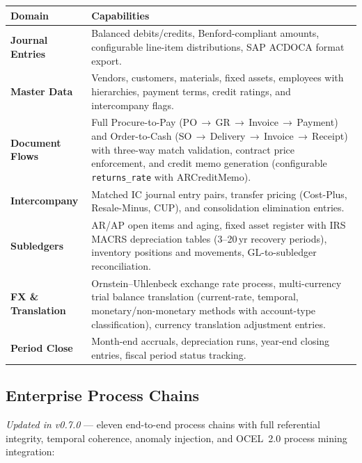 \documentclass[11pt,a4paper]{article}
\begin{document}
\vspace{0.4em}
\noindent
\renewcommand{\arraystretch}{1.25}
\begin{tabularx}{\textwidth}{>{\bfseries\color{brand}}l X}
\toprule
\textbf{Domain} & \textbf{Capabilities} \\
\midrule
Journal Entries &
  Balanced debits/credits, Benford-compliant amounts, configurable line-item
  distributions, SAP ACDOCA format export. \\
Master Data &
  Vendors, customers, materials, fixed assets, employees with hierarchies,
  payment terms, credit ratings, and intercompany flags. \\
Document Flows &
  Full Procure-to-Pay (PO\,$\to$\,GR\,$\to$\,Invoice\,$\to$\,Payment) and
  Order-to-Cash (SO\,$\to$\,Delivery\,$\to$\,Invoice\,$\to$\,Receipt) with
  three-way match validation, contract price enforcement, and credit memo
  generation (configurable \texttt{returns\_rate} with ARCreditMemo). \\
Intercompany &
  Matched IC journal entry pairs, transfer pricing (Cost-Plus, Resale-Minus,
  CUP), and consolidation elimination entries. \\
Subledgers &
  AR/AP open items and aging, fixed asset register with IRS MACRS depreciation
  tables (3--20\,yr recovery periods), inventory positions and movements,
  GL-to-subledger reconciliation. \\
FX \& Translation &
  Ornstein--Uhlenbeck exchange rate process, multi-currency trial balance
  translation (current-rate, temporal, monetary/non-monetary methods with
  account-type classification), currency translation adjustment entries. \\
Period Close &
  Month-end accruals, depreciation runs, year-end closing entries, fiscal
  period status tracking. \\
\bottomrule
\end{tabularx}
\renewcommand{\arraystretch}{1.0}

\subsection{Enterprise Process Chains}

\textit{Updated in v0.7.0} --- eleven end-to-end process chains with full
referential integrity, temporal coherence, anomaly injection, and
OCEL~2.0 process mining integration:
\end{document}
